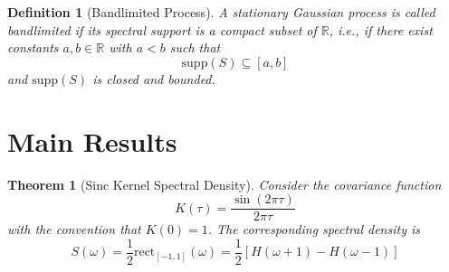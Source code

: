 \documentclass{article}
\newtheorem{definition}{Definition}
{\theorembodyfont{\rmfamily}\newtheorem{example}{Example}}
\newtheorem{theorem}{Theorem}
\begin{document}
\begin{definition}
  [Bandlimited Process] A stationary Gaussian process is called bandlimited if
  its spectral support is a compact subset of $\mathbb{R}$, i.e., if there
  exist constants $a, b \in \mathbb{R}$ with $a < b$ such that
  \begin{equation}
    \mathrm{supp} (S) \subseteq [a, b]
  \end{equation}
  and $\mathrm{supp} (S)$ is closed and bounded.
\end{definition}

\section{Main Results}

\begin{theorem}
  [Sinc Kernel Spectral Density] Consider the covariance function
  \begin{equation}
    K (\tau) = \frac{\sin (2 \pi \tau)}{2 \pi \tau}
  \end{equation}
  with the convention that $K (0) = 1$. The corresponding spectral density is
  \begin{equation}
    S (\omega) = \frac{1}{2} \mathrm{rect}_{[- 1, 1]} (\omega) = \frac{1}{2} 
    [H (\omega + 1) - H (\omega - 1)]
  \end{equation}
\end{theorem}
\end{document}
